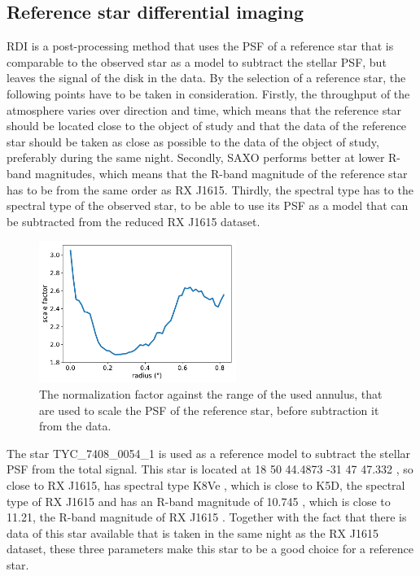 \documentclass[twoside,single,12pt]{lion-msc}
\begin{document}
\subsection{Reference star differential imaging}
RDI is a post-processing method that uses the PSF of a reference star that is comparable to the observed star as a model to subtract the stellar PSF, but leaves the signal of the disk in the data. By the selection of a reference star, the following points have to be taken in consideration. Firstly, the throughput of the atmosphere varies over direction and time, which means that the reference star should be located close to the object of study and that the data of the reference star should be taken as close as possible to the data of the object of study, preferably during the same night. Secondly, SAXO performs better at lower R-band magnitudes, which means that the R-band magnitude of the reference star has to be from the same order as RX J1615. Thirdly, the spectral type has to the spectral type of the observed star, to be able to use its PSF as a model that can be subtracted from the reduced RX J1615 dataset. 
\bigskip

\begin{figure}
\centering
\includegraphics[width = 0.57\textwidth]{normfac}
\caption{The normalization factor against the range of the used annulus, that are used to scale the PSF of the reference star, before subtraction it from the data.}
\label{fig:rdinorm}
\vspace{-5mm}
\end{figure}

\noindent
The star TYC\_7408\_0054\_1 is used as a reference model to subtract the stellar PSF from the total signal. This star is located at 18 50 44.4873 -31 47 47.332 \cite{Gaia2016}, so close to RX J1615, has spectral type K8Ve \cite{Torres2006}, which is close to K5D, the spectral type of RX J1615 \cite{Krautter1997} and has an R-band magnitude of 10.745 \cite{Gaia2016}, which is close to 11.21, the R-band magnitude of RX J1615 \cite{Makarov2007}. Together with the fact that there is data of this star available that is taken in the same night as the RX J1615 dataset, these three parameters make this star to be a good choice for a reference star.
\bigskip
\end{document}
